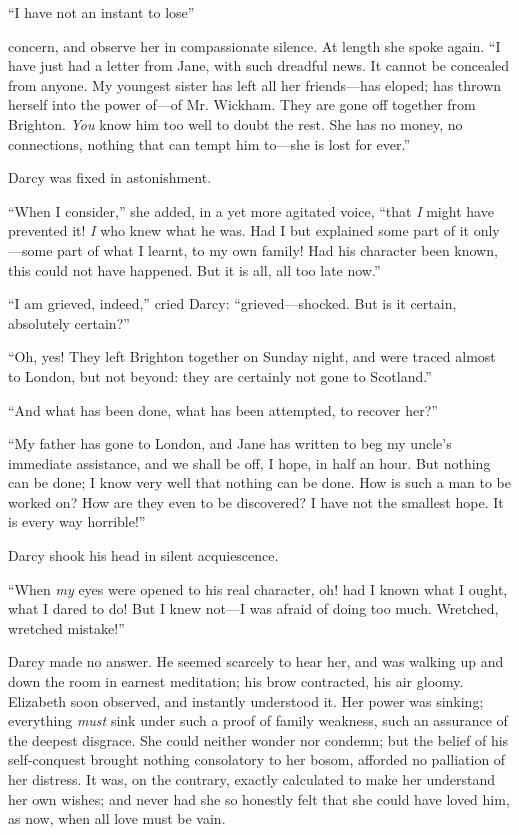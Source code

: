 \documentclass[12pt,openright]{book}
\begin{document}
“I have not an instant to lose”

concern, and observe her in compassionate silence. At length she spoke again. “I have just had a letter from Jane, with such dreadful news. It cannot be concealed from anyone. My youngest sister has left all her friends—has eloped; has thrown herself into the power of—of Mr. Wickham. They are gone off together from Brighton. \textit{You} know him too well to doubt the rest. She has no money, no connections, nothing that can tempt him to—she is lost for ever.”

Darcy was fixed in astonishment.

“When I consider,” she added, in a yet more agitated voice, “that \textit{I} might have prevented it! \textit{I} who knew what he was. Had I but explained some part of it only—some part of what I learnt, to my own family! Had his character been known, this could not have happened. But it is all, all too late now.”

“I am grieved, indeed,” cried Darcy: “grieved—shocked. But is it certain, absolutely certain?”

“Oh, yes! They left Brighton together on Sunday night, and were traced almost to London, but not beyond: they are certainly not gone to Scotland.”

“And what has been done, what has been attempted, to recover her?”

“My father has gone to London, and Jane has written to beg my uncle’s immediate assistance, and we shall be off, I hope, in half an hour. But nothing can be done; I know very well that nothing can be done. How is such a man to be worked on? How are they even to be discovered? I have not the smallest hope. It is every way horrible!”

Darcy shook his head in silent acquiescence.

“When \textit{my} eyes were opened to his real character, oh! had I known what I ought, what I dared to do! But I knew not—I was afraid of doing too much. Wretched, wretched mistake!”

Darcy made no answer. He seemed scarcely to hear her, and was walking up and down the room in earnest meditation; his brow contracted, his air gloomy. Elizabeth soon observed, and instantly understood it. Her power was sinking; everything \textit{must} sink under such a proof of family weakness, such an assurance of the deepest disgrace. She could neither wonder nor condemn; but the belief of his self-conquest brought nothing consolatory to her bosom, afforded no palliation of her distress. It was, on the contrary, exactly calculated to make her understand her own wishes; and never had she so honestly felt that she could have loved him, as now, when all love must be vain.
\end{document}
